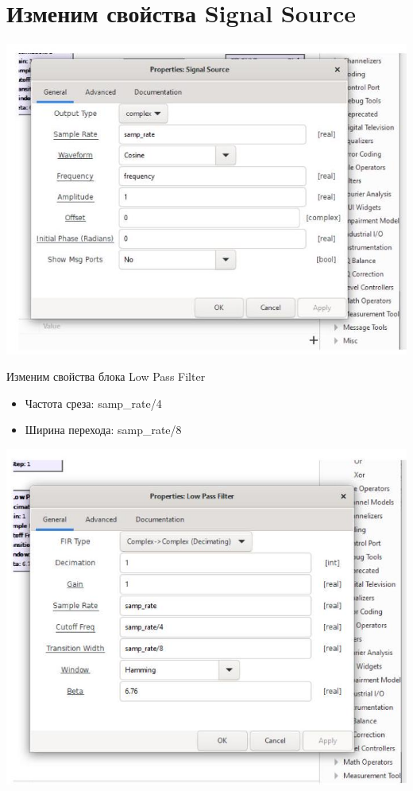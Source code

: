 \documentclass[10pt]{article}
\begin{document}
\section*{Изменим свойства Signal Source}
\begin{center}
\includegraphics[max width=\textwidth]{signal}
\end{center}

Изменим свойства блока Low Pass Filter

\begin{itemize}
  \item Частота среза: samp\_rate/4
  \item Ширина перехода: samp\_rate/8
\end{itemize}

\begin{center}
\includegraphics[max width=\textwidth]{low}
\end{center}
\end{document}
